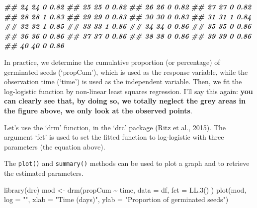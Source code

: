 \documentclass[
]{book}
\newenvironment{Shaded}{\begin{snugshade}}{\end{snugshade}}
\newcommand{\AttributeTok}[1]{\textcolor[rgb]{0.77,0.63,0.00}{#1}}
\newcommand{\DocumentationTok}[1]{\textcolor[rgb]{0.56,0.35,0.01}{\textbf{\textit{#1}}}}
\newcommand{\FunctionTok}[1]{\textcolor[rgb]{0.00,0.00,0.00}{#1}}
\newcommand{\NormalTok}[1]{#1}
\newcommand{\OtherTok}[1]{\textcolor[rgb]{0.56,0.35,0.01}{#1}}
\newcommand{\SpecialCharTok}[1]{\textcolor[rgb]{0.00,0.00,0.00}{#1}}
\newcommand{\StringTok}[1]{\textcolor[rgb]{0.31,0.60,0.02}{#1}}
\begin{document}
\begin{Shaded}
\begin{Highlighting}[]
\DocumentationTok{\#\# 24   24      0    0.82}
\DocumentationTok{\#\# 25   25      0    0.82}
\DocumentationTok{\#\# 26   26      0    0.82}
\DocumentationTok{\#\# 27   27      0    0.82}
\DocumentationTok{\#\# 28   28      1    0.83}
\DocumentationTok{\#\# 29   29      0    0.83}
\DocumentationTok{\#\# 30   30      0    0.83}
\DocumentationTok{\#\# 31   31      1    0.84}
\DocumentationTok{\#\# 32   32      1    0.85}
\DocumentationTok{\#\# 33   33      1    0.86}
\DocumentationTok{\#\# 34   34      0    0.86}
\DocumentationTok{\#\# 35   35      0    0.86}
\DocumentationTok{\#\# 36   36      0    0.86}
\DocumentationTok{\#\# 37   37      0    0.86}
\DocumentationTok{\#\# 38   38      0    0.86}
\DocumentationTok{\#\# 39   39      0    0.86}
\DocumentationTok{\#\# 40   40      0    0.86}
\end{Highlighting}
\end{Shaded}

In practice, we determine the cumulative proportion (or percentage) of germinated seeds (`propCum'), which is used as the response variable, while the observation time (`time') is used as the independent variable. Then, we fit the log-logistic function by non-linear least squares regression. I'll say this again: \textbf{you can clearly see that, by doing so, we totally neglect the grey areas in the figure above, we only look at the observed points}.

Let's use the `drm' function, in the `drc' package (Ritz et al., 2015). The argument `fct' is used to set the fitted function to log-logistic with three parameters (the equation above).

The \texttt{plot()} and \texttt{summary()} methods can be used to plot a graph and to retrieve the estimated parameters.

\begin{Shaded}
\begin{Highlighting}[]
\FunctionTok{library}\NormalTok{(drc)}
\NormalTok{mod }\OtherTok{\textless{}{-}} \FunctionTok{drm}\NormalTok{(propCum }\SpecialCharTok{\textasciitilde{}}\NormalTok{ time, }\AttributeTok{data =}\NormalTok{ df,}
           \AttributeTok{fct =} \FunctionTok{LL.3}\NormalTok{() )}
\FunctionTok{plot}\NormalTok{(mod, }\AttributeTok{log =} \StringTok{""}\NormalTok{,}
      \AttributeTok{xlab =} \StringTok{"Time (days)"}\NormalTok{,}
      \AttributeTok{ylab =} \StringTok{"Proportion of germinated seeds"}\NormalTok{)}
\end{Highlighting}
\end{Shaded}
\end{document}
